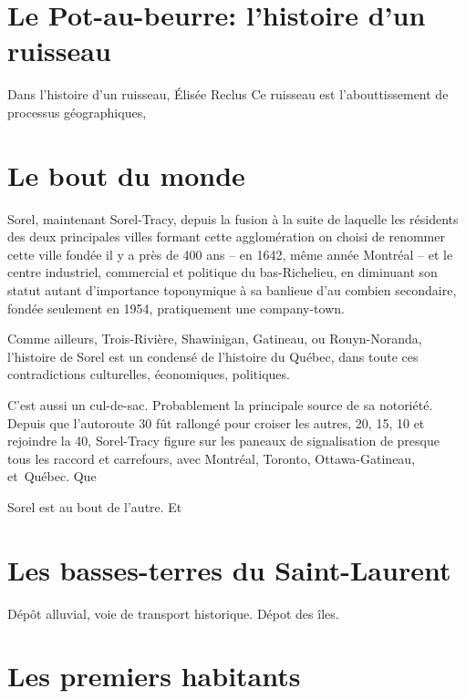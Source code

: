 \documentclass[12pt]{report}
\begin{document}
\chapter{Le Pot-au-beurre: l'histoire d'un ruisseau}
Dans l'histoire d'un ruisseau, Élisée Reclus
Ce ruisseau est l'abouttissement de processus géographiques, 




\chapter{Le bout du monde}
Sorel, maintenant Sorel-Tracy, depuis la fusion à la suite de laquelle les résidents des deux principales villes formant cette agglomération on choisi de renommer cette ville \og fondée \fg il y a près de 400 ans -- en 1642, même année Montréal -- et le centre industriel, commercial et politique du bas-Richelieu, en diminuant son statut autant d'importance toponymique à sa banlieue d'au combien secondaire, fondée seulement en 1954, pratiquement une company-town. 

Comme ailleurs, Trois-Rivière, Shawinigan, Gatineau, ou Rouyn-Noranda, l'histoire de Sorel est un condensé de l'histoire du Québec, dans toute ces contradictions culturelles, économiques, politiques. 

C'est aussi un cul-de-sac. Probablement la principale source de sa notoriété. Depuis que l'autoroute 30 fût rallongé pour croiser les autres, 20, 15, 10 et rejoindre la 40, Sorel-Tracy figure sur les paneaux de signalisation de presque tous les raccord et carrefours, avec Montréal, Toronto, Ottawa-Gatineau, et Québec. Que

Sorel est au bout de l'autre. Et 


\chapter{Les basses-terres du Saint-Laurent}

Dépôt alluvial, voie de transport historique. Dépot des îles. 

\chapter{Les premiers habitants}
\end{document}
